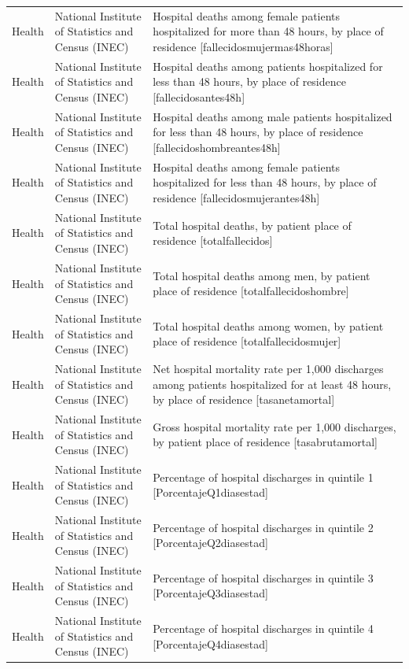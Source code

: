 \begin{landscape}
\begin{longtable}[t]{>{\raggedright\arraybackslash}p{3.4cm}>{\raggedright\arraybackslash}p{5.6cm}>{\raggedright\arraybackslash}p{12.4cm}}
Health & National Institute of Statistics and Census (INEC) & Hospital deaths among female patients hospitalized for more than 48 hours, by place of residence [fallecidosmujermas48ho\allowbreak{}ras]\\
Health & National Institute of Statistics and Census (INEC) & Hospital deaths among patients hospitalized for less than 48 hours, by place of residence [fallecidosantes48h]\\
Health & National Institute of Statistics and Census (INEC) & Hospital deaths among male patients hospitalized for less than 48 hours, by place of residence [fallecidoshombreantes4\allowbreak{}8h]\\
Health & National Institute of Statistics and Census (INEC) & Hospital deaths among female patients hospitalized for less than 48 hours, by place of residence [fallecidosmujerantes48\allowbreak{}h]\\
Health & National Institute of Statistics and Census (INEC) & Total hospital deaths, by patient place of residence [totalfallecidos]\\
Health & National Institute of Statistics and Census (INEC) & Total hospital deaths among men, by patient place of residence [totalfallecidoshombre]\\
Health & National Institute of Statistics and Census (INEC) & Total hospital deaths among women, by patient place of residence [totalfallecidosmujer]\\
Health & National Institute of Statistics and Census (INEC) & Net hospital mortality rate per 1,000 discharges among patients hospitalized for at least 48 hours, by place of residence [tasanetamortal]\\
Health & National Institute of Statistics and Census (INEC) & Gross hospital mortality rate per 1,000 discharges, by patient place of residence [tasabrutamortal]\\
Health & National Institute of Statistics and Census (INEC) & Percentage of hospital discharges in quintile 1 [PorcentajeQ1diasestad]\\
Health & National Institute of Statistics and Census (INEC) & Percentage of hospital discharges in quintile 2 [PorcentajeQ2diasestad]\\
Health & National Institute of Statistics and Census (INEC) & Percentage of hospital discharges in quintile 3 [PorcentajeQ3diasestad]\\
Health & National Institute of Statistics and Census (INEC) & Percentage of hospital discharges in quintile 4 [PorcentajeQ4diasestad]\\

\end{longtable}
\end{landscape}
